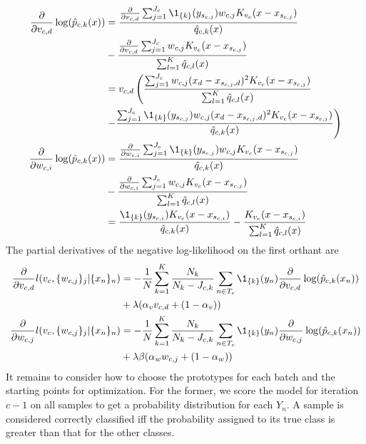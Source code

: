 %
\begin{align}
\frac{\partial}{\partial v_{c,d}}\log(\hat{p}_{c,k}(x))&
=\frac{\frac{\partial}{\partial v_{c,d}}
\sum_{j=1}^{J_c}\1_{\{k\}}(y_{s_{c,j}})w_{c,j}K_{v_c}(x-x_{s_{c,j}})}
{\hat{q}_{c,k}(x)}
\label{eq_p_partial_v}\\
&-\frac{\frac{\partial}{\partial v_{c,d}}
\sum_{j=1}^{J_c}w_{c,j}K_{v_c}(x-x_{s_{c,j}})}
{\sum_{l=1}^K\hat{q}_{c,l}(x)}\notag\\
&=v_{c,d}\left(\frac{\sum_{j=1}^{J_c}w_{c,j}
(x_d-x_{s_{c,j},d})^2K_{v_c}(x-x_{s_{c,j}})}
{\sum_{l=1}^K\hat{q}_{c,l}(x)}\right.\notag\\
&\left.-\frac{\sum_{j=1}^{J_c}\1_{\{k\}}(y_{s_{c,j}})w_{c,j}
(x_d-x_{s_{c,j},d})^2K_{v_c}(x-x_{s_{c,j}})}
{\hat{q}_{c,k}(x)}\right)\notag\\
\frac{\partial}{\partial w_{c,i}}\log(\hat{p}_{c,k}(x))&
=\frac{\frac{\partial}{\partial w_{c,i}}
\sum_{j=1}^{J_c}\1_{\{k\}}(y_{s_{c,j}})w_{c,j}K_{v_c}(x-x_{s_{c,j}})}
{\hat{q}_{c,k}(x)}
\label{eq_p_partial_w}\\
&-\frac{\frac{\partial}{\partial w_{c,i}}
\sum_{j=1}^{J_c}w_{c,j}K_{v_c}(x-x_{s_{c,j}})}
{\sum_{l=1}^K\hat{q}_{c,l}(x)}\notag\\
&=\frac{\1_{\{k\}}(y_{s_{c,i}})K_{v_c}(x-x_{s_{c,i}})}
{\hat{q}_{c,k}(x)}
-\frac{K_{v_c}(x-x_{s_{c,i}})}
{\sum_{l=1}^K\hat{q}_{c,l}(x)}\notag
\end{align}
%
The partial derivatives of the negative log-likelihood on the first orthant are
%
\begin{align}
\frac{\partial}{\partial v_{c,d}}l(v_c,\{w_{c,j}\}_j|\{x_n\}_n)
&=-\frac{1}{N}\sum_{k=1}^K\frac{N_k}{N_k-J_{c,k}}\sum_{n\in T_c}
\1_{\{k\}}(y_n)\frac{\partial}{\partial v_{c,d}}\log(\hat{p}_{c,k}(x_n))
\label{eq_l_partial_v}\\
&+\lambda(\alpha_v v_{c,d}+(1-\alpha_v))\notag\\
\frac{\partial}{\partial w_{c,j}}l(v_c,\{w_{c,j}\}_j|\{x_n\}_n)
&=-\frac{1}{N}\sum_{k=1}^K\frac{N_k}{N_k-J_{c,k}}\sum_{n\in T_c}
\1_{\{k\}}(y_n)\frac{\partial}{\partial w_{c,j}}\log(\hat{p}_{c,k}(x_n))
\notag\\
&+\lambda\beta(\alpha_w w_{c,j}+(1-\alpha_w))\notag
\end{align}
%
It remains to consider how to choose the prototypes for each batch and the starting points for optimization.
For the former, we score the model for iteration $c-1$ on all samples to get a probability distribution for each $Y_n$.
A sample is considered correctly classified iff the probability assigned to its true class is greater than that for the other classes.
